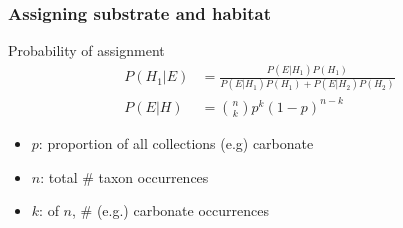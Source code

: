 \documentclass{beamer}
\begin{document}
\begin{frame}
  \frametitle{Assigning substrate and habitat}

  \begin{block}{Probability of assignment}
    \begin{align*}
      P(H_{1}|E) &= \frac{P(E|H_{1})P(H_{1})}{P(E|H_{1})P(H_{1}) + P(E|H_{2})P(H_{2})} \\
      P(E|H) &= \binom{n}{k} p^{k}(1 - p)^{n - k}
    \end{align*}

    \begin{itemize}
      \item \(p\): proportion of all collections (e.g) carbonate
      \item \(n\): total \# taxon occurrences
      \item \(k\): of \(n\), \# (e.g.) carbonate occurrences
    \end{itemize}

    \tiny{}
  \end{block}
\end{frame}
\end{document}
